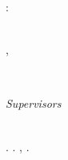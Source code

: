 \begin{titlepage}
	
	
	{\Huge \thesistitle: \\ \thesissubtitle}\\%
	
	
	
	\begin{minipage}{0.5\textwidth}
		\begin{flushleft}
			\Large
			\thesisauthor, \studentnumber
		\end{flushleft}
	\end{minipage} \\[15mm]
	\begin{minipage}{\textwidth}
		\begin{flushleft}
			\large
			\textit{Supervisors}\\
			\thesissupervisorI \\
			\thesissupervisorII
		\end{flushleft}
	\end{minipage}
	
	
	
	\vfill %
	
	{\large\thedate} %
	
	
	 
	
	\vfill
	\begin{minipage}{\textwidth}
		\begin{flushleft}
			\small
			\department. \departmentdescriber. 
			\addressI, 	\addressII. \departmentwebsite	\\[0.2cm]
		\end{flushleft}
	\end{minipage}
	
	\vfill %

\end{titlepage}
